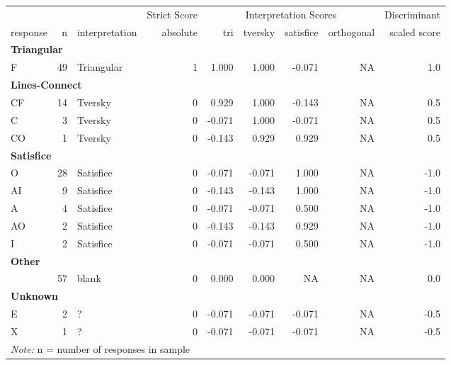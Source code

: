 \documentclass[
  letterpaper,
  DIV=11,
  numbers=noendperiod]{scrreprt}
\begin{document}
\begin{tabular}[t]{l|r|l|r|r|r|r|r|r}
\hline
\multicolumn{3}{c|}{ } & \multicolumn{1}{c|}{Strict Score} & \multicolumn{4}{c|}{Interpretation Scores} & \multicolumn{1}{c}{Discriminant} \\
\cline{4-4} \cline{5-8} \cline{9-9}
response & n & interpretation & absolute & tri & tversky & satisfice & orthogonal & scaled score\\
\hline
\multicolumn{9}{l}{\textbf{Triangular}}\\
\hline
\hspace{1em}F & 49 & Triangular & 1 & 1.000 & 1.000 & -0.071 & NA & 1.0\\
\hline
\multicolumn{9}{l}{\textbf{Lines-Connect}}\\
\hline
\hspace{1em}CF & 14 & Tversky & 0 & 0.929 & 1.000 & -0.143 & NA & 0.5\\
\hline
\hspace{1em}C & 3 & Tversky & 0 & -0.071 & 1.000 & -0.071 & NA & 0.5\\
\hline
\hspace{1em}CO & 1 & Tversky & 0 & -0.143 & 0.929 & 0.929 & NA & 0.5\\
\hline
\multicolumn{9}{l}{\textbf{Satisfice}}\\
\hline
\hspace{1em}O & 28 & Satisfice & 0 & -0.071 & -0.071 & 1.000 & NA & -1.0\\
\hline
\hspace{1em}AI & 9 & Satisfice & 0 & -0.143 & -0.143 & 1.000 & NA & -1.0\\
\hline
\hspace{1em}A & 4 & Satisfice & 0 & -0.071 & -0.071 & 0.500 & NA & -1.0\\
\hline
\hspace{1em}AO & 2 & Satisfice & 0 & -0.143 & -0.143 & 0.929 & NA & -1.0\\
\hline
\hspace{1em}I & 2 & Satisfice & 0 & -0.071 & -0.071 & 0.500 & NA & -1.0\\
\hline
\multicolumn{9}{l}{\textbf{Other}}\\
\hline
\hspace{1em} & 57 & blank & 0 & 0.000 & 0.000 & NA & NA & 0.0\\
\hline
\multicolumn{9}{l}{\textbf{Unknown}}\\
\hline
\hspace{1em}E & 2 & ? & 0 & -0.071 & -0.071 & -0.071 & NA & -0.5\\
\hline
\hspace{1em}X & 1 & ? & 0 & -0.071 & -0.071 & -0.071 & NA & -0.5\\
\hline
\multicolumn{9}{l}{\rule{0pt}{1em}\textit{Note: } n = number of responses in sample}\\
\end{tabular}
\end{document}
